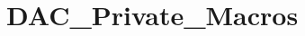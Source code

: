 \hypertarget{group___d_a_c___private___macros}{\section{D\-A\-C\-\_\-\-Private\-\_\-\-Macros}
\label{group___d_a_c___private___macros}
}
